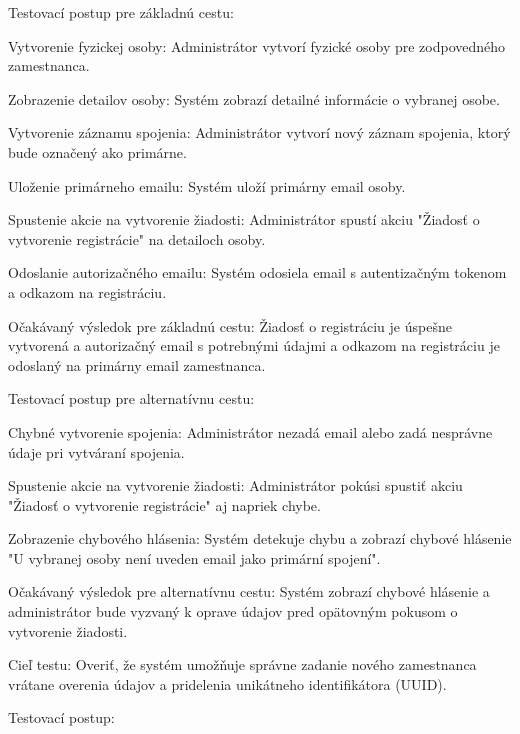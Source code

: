 \blank
Testovací postup pre základnú cestu:

\startitemize[n]
\item{Vytvorenie fyzickej osoby: Administrátor vytvorí fyzické osoby pre zodpovedného zamestnanca.}
\item{Zobrazenie detailov osoby: Systém zobrazí detailné informácie o vybranej osobe.}
\item{Vytvorenie záznamu spojenia: Administrátor vytvorí nový záznam spojenia, ktorý bude označený ako primárne.}
\item{Uloženie primárneho emailu: Systém uloží primárny email osoby.}
\item{Spustenie akcie na vytvorenie žiadosti: Administrátor spustí akciu "Žiadosť o vytvorenie registrácie" na detailoch osoby.}
\item{Odoslanie autorizačného emailu: Systém odosiela email s autentizačným tokenom a odkazom na registráciu.}
\stopitemize

Očakávaný výsledok pre základnú cestu: Žiadosť o registráciu je úspešne vytvorená a autorizačný email s potrebnými údajmi a odkazom na registráciu je odoslaný na primárny email zamestnanca.

\blank
Testovací postup pre alternatívnu cestu:

\startitemize[n]
\item{Chybné vytvorenie spojenia: Administrátor nezadá email alebo zadá nesprávne údaje pri vytváraní spojenia.}
\item{Spustenie akcie na vytvorenie žiadosti: Administrátor pokúsi spustiť akciu "Žiadosť o vytvorenie registrácie" aj napriek chybe.}
\item{Zobrazenie chybového hlásenia: Systém detekuje chybu a zobrazí chybové hlásenie "U vybranej osoby není uveden email jako primární spojení".}
\stopitemize

Očakávaný výsledok pre alternatívnu cestu: Systém zobrazí chybové hlásenie a administrátor bude vyzvaný k oprave údajov pred opätovným pokusom o vytvorenie žiadosti.


Cieľ testu: Overiť, že systém umožňuje správne zadanie nového zamestnanca vrátane overenia údajov a pridelenia unikátneho identifikátora (UUID).

\blank
Testovací postup:

